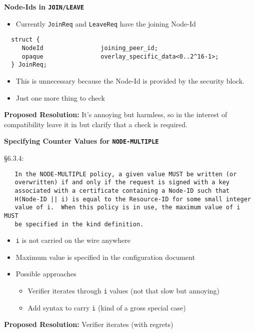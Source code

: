 \documentclass[helvetica]{seminar}
\newcommand{\heading}[1]{%
  \begin{center} 
    \large\bf 
    #1 
  \end{center} 
  \vspace{.4 in}}
\begin{document}
\begin{slide}
\heading{Node-Ids in \texttt{JOIN/LEAVE}}

\begin{itemize}
\item Currently \verb^JoinReq^ and \verb^LeaveReq^ have the joining 
  Node-Id
\end{itemize}

{\footnotesize
\begin{verbatim}
  struct {
     NodeId                joining_peer_id;
     opaque                overlay_specific_data<0..2^16-1>;
  } JoinReq;
\end{verbatim}
}

\begin{itemize}
\item This is unnecessary because the Node-Id is provided by the security block.
\item Just one more thing to check
\end{itemize}

\vspace{1em}
\textbf{Proposed Resolution:} It's annoying but harmless, so in the interest
of compatibility leave it in but clarify that a check is required.
\end{slide}



\begin{slide}
\heading{Specifying Counter Values for \texttt{NODE-MULTIPLE}}


\vspace{-2em}
\S 6.3.4:

{\footnotesize
\begin{verbatim}
   In the NODE-MULTIPLE policy, a given value MUST be written (or
   overwritten) if and only if the request is signed with a key
   associated with a certificate containing a Node-ID such that
   H(Node-ID || i) is equal to the Resource-ID for some small integer
   value of i.  When this policy is in use, the maximum value of i MUST
   be specified in the kind definition.
\end{verbatim}
}

\begin{itemize}
\item \verb^i^ is not carried on the wire anywhere
\item Maximum value is specified in the configuration document
\item Possible approaches
\begin{itemize}
\item Verifier iterates through \verb^i^ values (not that slow but annoying)
\item Add syntax to carry \verb^i^ (kind of a gross special case)
\end{itemize}
\end{itemize}

\vspace{1em}
\textbf{Proposed Resolution:} Verifier iterates (with regrets)
\end{slide}
\end{document}
